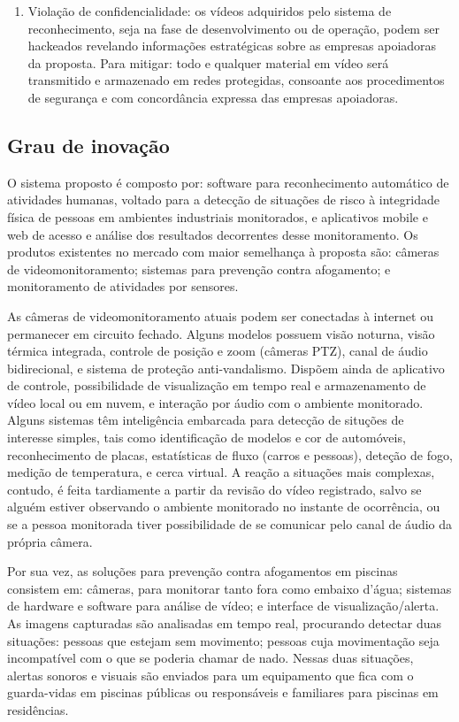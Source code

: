\begin{enumerate}
	\item Violação de confidencialidade: os vídeos adquiridos pelo sistema de reconhecimento, seja na fase de desenvolvimento ou de operação, podem ser hackeados revelando informações estratégicas sobre as empresas apoiadoras da proposta. Para mitigar: todo e qualquer material em vídeo será transmitido e armazenado em redes protegidas, consoante aos procedimentos de segurança e com concordância expressa das empresas apoiadoras. 
\end{enumerate}


\subsection{Grau de inovação}
\label{ssec:inova}
O sistema proposto é composto por: software para reconhecimento automático de atividades humanas, voltado para a detecção de situações de risco à integridade física de pessoas em ambientes industriais monitorados, e aplicativos mobile e web de acesso e análise dos resultados decorrentes desse monitoramento. 
Os produtos existentes no mercado com maior semelhança à proposta são: câmeras de videomonitoramento; sistemas para prevenção contra afogamento; e monitoramento de atividades por sensores. 

As câmeras de videomonitoramento atuais podem ser conectadas à internet ou permanecer em circuito fechado. Alguns modelos possuem visão noturna, visão térmica integrada, controle de posição e zoom (câmeras PTZ), canal de áudio bidirecional, e sistema de proteção anti-vandalismo. Dispõem ainda de aplicativo de controle, possibilidade de visualização em tempo real e armazenamento de vídeo local ou em nuvem, e interação por áudio com o ambiente monitorado. Alguns sistemas têm inteligência embarcada para detecção de situções de interesse simples, tais como identificação de modelos e cor de automóveis, reconhecimento de placas, estatísticas de fluxo (carros e pessoas), deteção de fogo, medição de temperatura, e cerca virtual. A reação a situações mais complexas, contudo, é feita tardiamente a partir da revisão do vídeo registrado, salvo se alguém estiver observando o ambiente monitorado no instante de ocorrência, ou se a pessoa monitorada tiver possibilidade de se comunicar pelo canal de áudio da própria câmera. 

Por sua vez, as soluções para prevenção contra afogamentos em piscinas consistem em: câmeras, para monitorar tanto fora como embaixo d’água; sistemas de hardware e software para análise de vídeo; e interface de visualização/alerta. As imagens capturadas são analisadas em tempo real, procurando detectar duas situações: pessoas que estejam sem movimento; pessoas cuja movimentação seja incompatível com o que se poderia chamar de nado. Nessas duas situações, alertas sonoros e visuais são enviados para um equipamento que fica com o guarda-vidas em piscinas públicas ou responsáveis e familiares para piscinas em residências.


